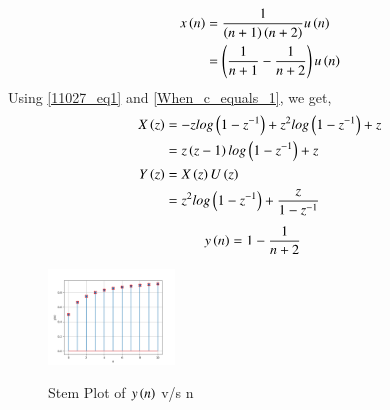 \documentclass[journal,12pt,twocolumn]{IEEEtran}
\theoremstyle{remark}
\begin{document}
\solution
\begin{table}[ht]

\end{table}
\begin{align}
x\left(n\right) &= \frac{1}{\left(n+1\right)\left(n+2\right)}u\left(n\right)\\
& = \left(\frac{1}{n+1} - \frac{1}{n+2}\right)u\left(n\right)\\
\end{align}
Using \eqref{11027_eq1} and \eqref{When_c_equals_1}, we get,
\begin{align}X\left(z\right) &= -z log\left(1-z^{-1}\right) + z^2 log\left(1-z^{-1}\right) + z\\
&= z\left(z-1\right)log\left(1-z^{-1}\right) + z\\
    Y\left(z\right) &= X\left(z\right)U\left(z\right)\\
     &=z^2log\left(1-z^{-1}\right) + \frac{z}{1-z^{-1}} \\
\end{align}
\begin{align}
    y\left(n\right) &= 1 - \frac{1}{n+2}
\end{align}
\newpage
\begin{figure}[h]
    \includegraphics[width=0.3\textwidth]{figs/y(n)_vs_n.png}\label{fig:stem-plot}
    \caption{Stem Plot of $y\left(n\right)$ v/s n}
\end{figure}
\end{document}
